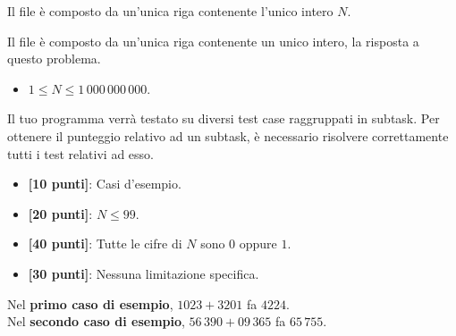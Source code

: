 \InputFile
Il file  è composto da un'unica riga contenente l'unico intero $N$.

\OutputFile
Il file \outputfile{} è composto da un'unica riga contenente un unico intero, la risposta a questo problema.

\Constraints
\begin{itemize}[nolistsep, itemsep=2mm]
	\item $1 \le N \le 1\,000\,000\,000$.
\end{itemize}

\pagebreak
\Scoring
Il tuo programma verrà testato su diversi test case raggruppati in subtask.
Per ottenere il punteggio relativo ad un subtask, è necessario risolvere
correttamente tutti i test relativi ad esso.

\begin{itemize}[nolistsep,itemsep=2mm]
  \item \textbf{ [10 punti]}: Casi d'esempio.
  \item \textbf{ [20 punti]}: $N \leq 99$.
  \item \textbf{ [40 punti]}: Tutte le cifre di $N$ sono $0$ oppure $1$.
  \item \textbf{ [30 punti]}: Nessuna limitazione specifica.
\end{itemize}

\Examples
\begin{example}
%
\end{example}
\begin{example}
%
\end{example}


\Explanation
Nel \textbf{primo caso di esempio}, $1023 + 3201$ fa $4224$.\\[2mm]
Nel \textbf{secondo caso di esempio}, $56\,390 + 09\,365$ fa $65\,755$.
